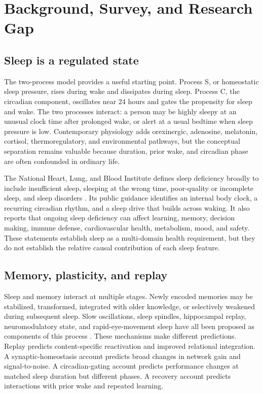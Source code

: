 \documentclass[conference]{IEEEtran}
\begin{document}
\section{Background, Survey, and Research Gap}
\subsection{Sleep is a regulated state}
The two-process model provides a useful starting point. Process S, or homeostatic sleep pressure, rises during wake and dissipates during sleep. Process C, the circadian component, oscillates near 24 hours and gates the propensity for sleep and wake. The two processes interact: a person may be highly sleepy at an unusual clock time after prolonged wake, or alert at a usual bedtime when sleep pressure is low. Contemporary physiology adds orexinergic, adenosine, melatonin, cortisol, thermoregulatory, and environmental pathways, but the conceptual separation remains valuable because duration, prior wake, and circadian phase are often confounded in ordinary life.

The National Heart, Lung, and Blood Institute defines sleep deficiency broadly to include insufficient sleep, sleeping at the wrong time, poor-quality or incomplete sleep, and sleep disorders \cite{NHLBI2022}. Its public guidance identifies an internal body clock, a recurring circadian rhythm, and a sleep drive that builds across waking. It also reports that ongoing sleep deficiency can affect learning, memory, decision making, immune defense, cardiovascular health, metabolism, mood, and safety. These statements establish sleep as a multi-domain health requirement, but they do not establish the relative causal contribution of each sleep feature.

\subsection{Memory, plasticity, and replay}
Sleep and memory interact at multiple stages. Newly encoded memories may be stabilized, transformed, integrated with older knowledge, or selectively weakened during subsequent sleep. Slow oscillations, sleep spindles, hippocampal replay, neuromodulatory state, and rapid-eye-movement sleep have all been proposed as components of this process \cite{Walker2006,RaschBorn2013,Klinzing2019}. These mechanisms make different predictions. Replay predicts content-specific reactivation and improved relational integration. A synaptic-homeostasis account predicts broad changes in network gain and signal-to-noise. A circadian-gating account predicts performance changes at matched sleep duration but different phases. A recovery account predicts interactions with prior wake and repeated learning.
\end{document}
